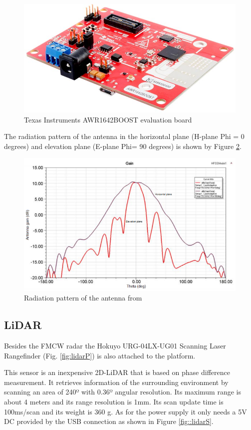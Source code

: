 \begin{figure}[ht!] 
\centerline{\includegraphics [width=0.5 \textwidth]{imgs/chapter4/awr1642.jpg}}
\caption{Texas Instruments AWR1642BOOST evaluation board}
\label{fig:awr}
\end{figure}


The radiation pattern of the antenna in the horizontal plane (H-plane Phi = 0 degrees) and elevation plane (E-plane Phi= 90 degrees) is shown by Figure \ref{fig:el}.
\begin{figure}[ht!] 
\centerline{\includegraphics [width=0.9 \textwidth]{imgs/chapter4/elevation.png}}
\caption[Radiation pattern of the antenna]{Radiation pattern of the antenna from \cite{el}}
\label{fig:el}
\end{figure}

\subsection{LiDAR}
Besides the \ac{FMCW} \ac{radar} the Hokuyo URG-04LX-UG01 Scanning Laser Rangefinder (Fig. \ref{fig:lidarP}) is also attached to the platform.

This sensor is an inexpensive 2D-\ac{LiDAR} that is based on phase difference measurement. It retrieves information of the surrounding environment by scanning an area of 240º with 0.36º angular resolution. Its maximum range is about 4 meters and its range resolution is 1mm. Its scan update time is 100ms/scan and its weight is 360 g.  As for the power supply it only needs a 5V DC provided by the USB connection as shown in Figure \ref{fig::lidarS}.




